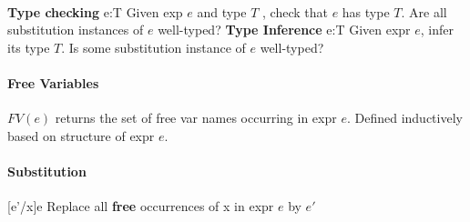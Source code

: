 \begin{minipage}{.2\linewidth}
  \begin{prooftree}
  \end{prooftree}
  \begin{prooftree}
  \end{prooftree}
  \begin{prooftree}
  \end{prooftree}
\end{minipage}
\\
\textbf{Type checking} e:T Given exp $e$ and type $T$
, check that $e$ has type $T$. Are all substitution instances of $e$
well-typed? \textbf{Type Inference} e:T Given expr
$e$, infer its type $T$. Is some substitution instance of $e$ well-typed?
\vspace{-1 em}
\paragraph{Free Variables}
$FV(e)$ returns the set of free var names occurring in expr
$e$. Defined inductively based on structure of expr $e$.
\vspace{-1 em}
\paragraph{Substitution}[e'/x]e Replace all \textbf{free} occurrences
of x in expr $e$ by $e'$
\vspace{-1 em}

